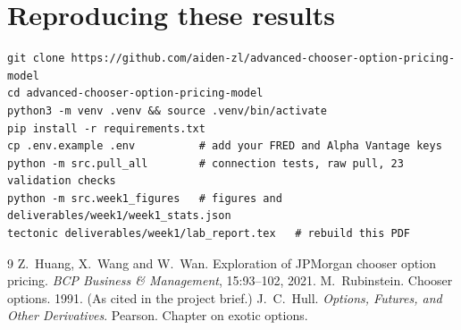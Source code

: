 \documentclass[11pt]{article}
\begin{document}
\appendix
\section{Reproducing these results}
\begin{lstlisting}
git clone https://github.com/aiden-zl/advanced-chooser-option-pricing-model
cd advanced-chooser-option-pricing-model
python3 -m venv .venv && source .venv/bin/activate
pip install -r requirements.txt
cp .env.example .env          # add your FRED and Alpha Vantage keys
python -m src.pull_all        # connection tests, raw pull, 23 validation checks
python -m src.week1_figures   # figures and deliverables/week1/week1_stats.json
tectonic deliverables/week1/lab_report.tex   # rebuild this PDF
\end{lstlisting}

\begin{thebibliography}{9}\small
{} Z.~Huang, X.~Wang and W.~Wan. Exploration of JPMorgan chooser option pricing.
  \emph{BCP Business \& Management}, 15:93--102, 2021.
 M.~Rubinstein. Chooser options. 1991. (As cited in the project brief.)
 J.~C.~Hull. \emph{Options, Futures, and Other Derivatives}. Pearson. Chapter on exotic options.
\end{thebibliography}
\end{document}
